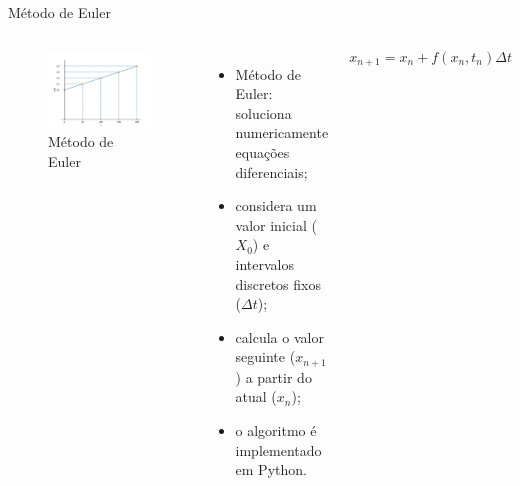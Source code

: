 \begin{frame}{Método de Euler}
	\begin{columns}[t]
		\column{5cm}
			\begin{figure}[tb]
				\centering
				\caption{Método de Euler}
				\label{fig:euler}
				\includegraphics[width=\linewidth]{figs/euler}
			\end{figure}
		\column{5cm}
		\begin{itemize}
			\item Método de Euler: soluciona numericamente equações diferenciais;
			\item considera um valor inicial ($X_0$) e intervalos discretos fixos ($\Delta t$);
			\item calcula o valor seguinte ($x_{n+1}$) a partir do atual ($x_n$);
			\item o algoritmo é implementado em Python.
		\end{itemize}
		\[
			x_{n+1}=x_n+f(x_n,t_n)\Delta t
		\]
	\end{columns}
\end{frame}
